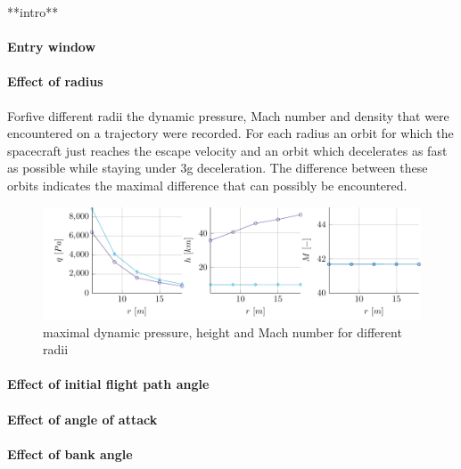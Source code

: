 **intro**

\paragraph{Entry window}

\paragraph{Effect of radius}

Forfive different radii the dynamic pressure, Mach number and density that were encountered on a trajectory were recorded. For each radius an orbit for which the spacecraft just reaches the escape velocity and an orbit which decelerates as fast as possible while staying under 3g deceleration. The difference between these orbits indicates the maximal difference that can possibly be encountered.

\begin{figure}[H]
	\centering
	\includegraphics[width=1\textwidth]{./Figure/radius_param.pdf}
	\caption{maximal dynamic pressure, height and Mach number for different radii}
	\label{fig:radius}
\end{figure}

\paragraph{Effect of initial flight path angle}

\paragraph{Effect of angle of attack}

\paragraph{Effect of bank angle}




